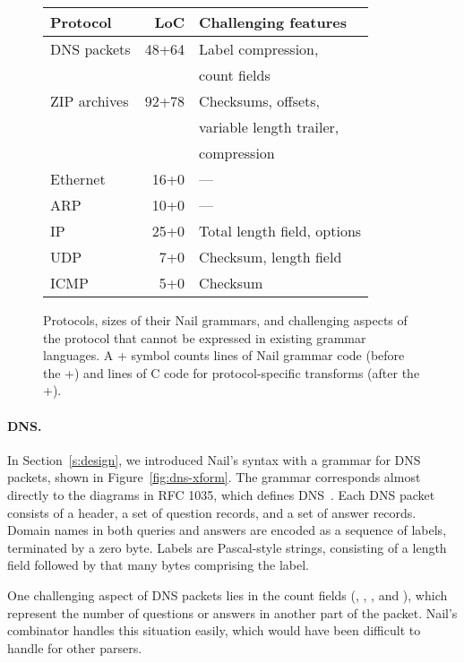 \begin{figure}[tb]
\centering
\begin{tabular}{lrl}
\toprule
\textbf{Protocol} & \textbf{LoC} & \textbf{Challenging features} \\ 
\midrule
DNS packets & 48+64 & Label compression,\\
  & & count fields \\
ZIP archives & 92+78 & Checksums, offsets, \\ 
  & & variable length trailer, \\
  & & compression \\
Ethernet  & 16+0\phantom{0} & --- \\
ARP       & 10+0\phantom{0} & --- \\
IP        & 25+0\phantom{0} & Total length field, options \\
UDP       &  7+0\phantom{0} & Checksum, length field \\
ICMP      &  5+0\phantom{0} & Checksum \\
\bottomrule
\end{tabular}

\caption{Protocols, sizes of their Nail grammars, and challenging aspects
of the protocol that cannot be expressed in existing grammar languages.
A + symbol counts lines of Nail grammar code (before the +) and lines of
C code for protocol-specific transforms (after the +).}
\label{fig:eval-protocols}
\end{figure}

\paragraph{DNS.}

In Section~\ref{s:design}, we introduced Nail's syntax with a grammar
for DNS packets, shown in Figure~\ref{fig:dns-xform}.
The grammar corresponds almost directly to the diagrams in RFC 1035,
which defines DNS~\cite[\S4]{RFC:1035}.  Each DNS packet consists of a
header, a set of question records, and a set of answer records. Domain
names in both queries and answers are encoded as a sequence of labels,
terminated by a zero byte.  Labels are Pascal-style strings, consisting
of a length field followed by that many bytes comprising the label.

One challenging aspect of DNS packets lies in the count fields (,
, , and ), which represent the number of questions
or answers in another part of the packet.  Nail's  combinator
handles this situation easily, which would have been difficult to handle
for other parsers.

